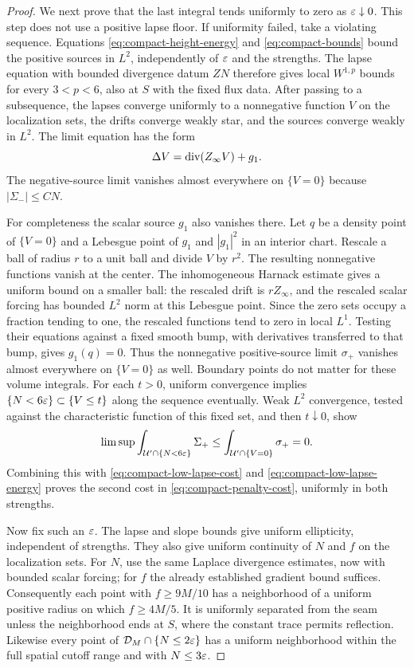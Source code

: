 \begin{proof}
We next prove that the last integral tends uniformly to zero as
$\varepsilon\downarrow0$. This step does not use a positive lapse floor.
If uniformity failed, take a violating sequence. Equations
\eqref{eq:compact-height-energy} and \eqref{eq:compact-bounds} bound
the positive sources in $L^2$, independently of $\varepsilon$ and the
strengths. The lapse equation with bounded divergence datum $ZN$
therefore gives local $W^{1,p}$ bounds for every $3<p<6$, also at $S$
with the fixed flux data. After passing to a subsequence, the lapses
converge uniformly to a nonnegative function $V$ on the localization
sets, the drifts converge weakly star, and the sources converge weakly
in $L^2$. The limit equation has the form
\[
 \Delta V=\operatorname{div}(Z_\infty V)+g_1.
\]
The negative-source limit vanishes almost everywhere on $\{V=0\}$
because $|\Sigma_-|\le CN$.

For completeness the scalar source $g_1$ also vanishes there. Let
$q$ be a density point of $\{V=0\}$ and a Lebesgue point of $g_1$
and $|g_1|^2$ in an interior chart. Rescale a ball of radius $r$ to a
unit ball and divide $V$ by $r^2$. The resulting nonnegative functions
vanish at the center. The inhomogeneous Harnack estimate gives a
uniform bound on a smaller ball: the rescaled drift is $rZ_\infty$,
and the rescaled scalar forcing has bounded $L^2$ norm at this
Lebesgue point. Since the zero sets occupy a fraction tending to one,
the rescaled functions tend to zero in local $L^1$. Testing their
equations against a fixed smooth bump, with derivatives transferred
to that bump, gives $g_1(q)=0$. Thus the nonnegative positive-source
limit $\sigma_+$ vanishes almost everywhere on $\{V=0\}$ as well.
Boundary points do not matter for these volume integrals. For each
$t>0$, uniform convergence implies
$\{N<6\varepsilon\}\subset\{V\le t\}$ along the sequence eventually.
Weak $L^2$ convergence, tested against the characteristic function of
this fixed set, and then $t\downarrow0$, show
\[
 \limsup\int_{\mathcal U'\cap\{N<6\varepsilon\}}\Sigma_+
 \le\int_{\mathcal U'\cap\{V=0\}}\sigma_+=0.
\]
Combining this with \eqref{eq:compact-low-lapse-cost} and
\eqref{eq:compact-low-lapse-energy} proves the second cost in
\eqref{eq:compact-penalty-cost}, uniformly in both strengths.

Now fix such an $\varepsilon$. The lapse and slope bounds give uniform
ellipticity, independent of strengths. They also give uniform
continuity of $N$ and $f$ on the localization sets. For $N$, use the
same Laplace divergence estimates, now with bounded scalar forcing;
for $f$ the already established gradient bound suffices. Consequently
each point with $f\ge9M/10$ has a neighborhood of a uniform positive
radius on which $f\ge4M/5$. It is uniformly separated from the seam
unless the neighborhood ends at $S$, where the constant trace permits
reflection. Likewise every point of
$\mathcal D_M\cap\{N\le2\varepsilon\}$ has a uniform neighborhood within
the full spatial cutoff range and with $N\le3\varepsilon$.


\end{proof}
